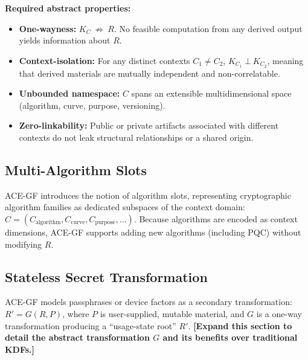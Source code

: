 \documentclass[11pt,a4paper]{article}
\begin{document}
\textbf{Required abstract properties:}
\begin{itemize}[noitemsep, nolistsep]
    \item \textbf{One-wayness:} $K_C \ \not\Rightarrow\ R$. No feasible computation from any derived output yields information about $R$.
    \item \textbf{Context-isolation:} For any distinct contexts $C_1 \neq C_2$, $K_{C_1} \ \bot\ K_{C_2}$, meaning that derived materials are mutually independent and non-correlatable.
    \item \textbf{Unbounded namespace:} $C$ spans an extensible multidimensional space (algorithm, curve, purpose, versioning).
    \item \textbf{Zero-linkability:} Public or private artifacts associated with different contexts do not leak structural relationships or a shared origin.
\end{itemize}

\subsection{Multi-Algorithm Slots}
ACE-GF introduces the notion of algorithm slots, representing cryptographic algorithm families as dedicated subspaces of the context domain: $C = (C_{\text{algorithm}}, C_{\text{curve}}, C_{\text{purpose}}, \ldots)$. Because algorithms are encoded as context dimensions, ACE-GF supports adding new algorithms (including PQC) without modifying $R$.

\subsection{Stateless Secret Transformation}
ACE-GF models passphrases or device factors as a secondary transformation: $R' = G(R, P)$, where $P$ is user-supplied, mutable material, and $G$ is a one-way transformation producing a ``usage-state root'' $R'$.
\textbf{[Expand this section to detail the abstract transformation $G$ and its benefits over traditional KDFs.]}

\begin{figure}[htbp]
  \centering
\end{figure}
\end{document}
